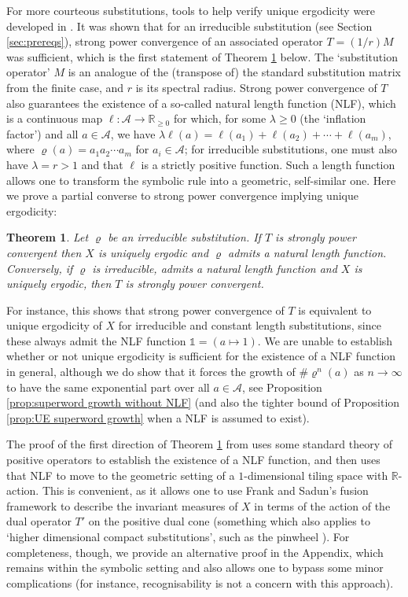 \documentclass[11pt]{amsart}
\numberwithin{equation}{section}
\theoremstyle{plain}
\newtheorem{theorem}{Theorem}[section]
\theoremstyle{definition}
\newcommand{\R}{{\mathbb R}}
\newcommand{\mc}{\mathcal}
\newcommand{\A}{\mc A}
\newcommand{\sub}{\varrho}
\newcommand{\bbo}{\mathds{1}} %
\begin{document}
For more courteous substitutions, tools to help verify unique ergodicity were developed in \cite{MRW25}. It was shown that for an irreducible substitution (see Section \ref{sec:prereqs}), strong power convergence of an associated operator \(T = (1/r)M\) was sufficient, which is the first statement of Theorem \ref{thm:main UE} below. The `substitution operator' \(M\) is an analogue of the (transpose of) the standard substitution matrix \cite{Fog02,BG13} from the finite case, and \(r\) is its spectral radius. Strong power convergence of \(T\) also guarantees the existence of a so-called natural length function (NLF), which is a continuous map \(\ell \colon \A \to \R_{\geq 0}\) for which, for some \(\lambda \geq 0\) (the `inflation factor') and all \(a \in \A\), we have \(\lambda \ell(a) = \ell(a_1) + \ell(a_2) + \cdots + \ell(a_m)\), where \(\sub(a) = a_1 a_2 \cdots a_m\) for \(a_i \in \A\); for irreducible substitutions, one must also have \(\lambda = r > 1\) and that \(\ell\) is a strictly positive function. Such a length function allows one to transform the symbolic rule into a geometric, self-similar one. Here we prove a partial converse to strong power convergence implying unique ergodicity:

\begin{theorem}\label{thm:main UE}
Let \(\sub\) be an irreducible substitution. If \(T\) is strongly power convergent then \(X\) is uniquely ergodic and \(\sub\) admits a natural length function. Conversely, if \(\sub\) is irreducible, admits a natural length function and \(X\) is uniquely ergodic, then \(T\) is strongly power convergent.
\end{theorem}

For instance, this shows that strong power convergence of \(T\) is equivalent to unique ergodicity of \(X\) for irreducible and constant length substitutions, since these always admit the NLF function \(\bbo = (a \mapsto 1)\). We are unable to establish whether or not unique ergodicity is sufficient for the existence of a NLF function in general, although we do show that it forces the growth of \(\# \sub^n(a)\) as \(n \to \infty\) to have the same exponential part over all \(a \in \A\), see Proposition \ref{prop:superword growth without NLF} (and also the tighter bound of Proposition \ref{prop:UE superword growth} when a NLF is assumed to exist).

The proof of the first direction of Theorem \ref{thm:main UE} from \cite{MRW25} uses some standard theory of positive operators to establish the existence of a NLF function, and then uses that NLF to move to the geometric setting of a \(1\)-dimensional tiling space \cite{Sad08} with \(\R\)-action. This is convenient, as it allows one to use Frank and Sadun's fusion framework \cite{FS14} to describe the invariant measures of \(X\) in terms of the action of the dual operator \(T'\) on the positive dual cone (something which also applies to `higher dimensional compact substitutions', such as the pinwheel \cite{Rad94}). For completeness, though, we provide an alternative proof in the Appendix, which remains within the symbolic setting and also allows one to bypass some minor complications (for instance, recognisability is not a concern with this approach).
\end{document}
